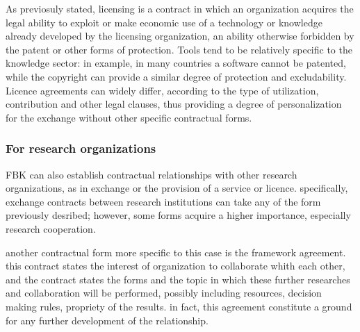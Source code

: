 As previosuly stated, licensing is a contract in which an organization acquires the legal ability to exploit or make economic use of a technology or knowledge already developed by the licensing organization, an ability otherwise forbidden by the patent or other forms of protection. Tools tend to be relatively specific to the knowledge sector: in example, in many countries a software cannot be patented, while the copyright can provide a similar degree of protection and excludability. Licence agreements can widely differ, according to the type of utilization, contribution and other legal clauses, thus providing a degree of personalization for the exchange without other specific contractual forms.

\subsubsection{For research organizations}

FBK can also establish contractual relationships with other research organizations, as in exchange or the provision of a service or licence. specifically, exchange contracts between research institutions can take any of the form previously desribed; however, some forms acquire a higher importance, especially research cooperation.

another contractual form more specific to this case is the framework agreement. this contract states the interest of organization to collaborate whith each other, and the contract states the forms and the topic in which these further researches and collaboration will be performed, possibly including resources, decision making rules, propriety of the results. in fact, this agreement constitute a ground for any further development of the relationship.

